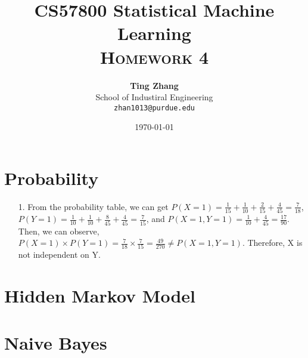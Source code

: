 \documentclass[11pt]{article}
\title{
\textbf{CS57800 Statistical Machine Learning} \\ \textsc{Homework 4} \\
\normalsize\vspace{0.1in}
}
\author{
	\textbf{Ting Zhang} \\
	School of Industiral Engineering\\
	\texttt{zhan1013@purdue.edu}
}
\date{\today}
\begin{document}
\maketitle

\section{Probability}
\begin{itemize}
\item[1.]
From the probability table, we can get $P(X=1)=\frac{1}{15}+\frac{1}{10}+\frac{2}{15}+\frac{4}{45}=\frac{7}{18}$, $P(Y=1)=\frac{1}{10}+\frac{1}{10}+\frac{8}{45}+\frac{4}{45}=\frac{7}{15}$, and $P(X=1,Y=1)=\frac{1}{10}+\frac{4}{45}=\frac{17}{90}$. Then, we can observe, $P(X=1) \times P(Y=1) = \frac{7}{18} \times \frac{7}{15} = \frac{49}{270} \neq P(X=1,Y=1)$. Therefore, X is not independent on Y.
\end{itemize}
\section{Hidden Markov Model}

\section{Naive Bayes}


%
%
\end{document}
